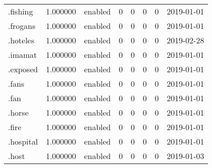 \begin{tabular}{lrlrrrrl}
.fishing                  &          1.000000 &         enabled &                           0 &                           0 &                           0 &                   0 &           2019-01-01 \\
.frogans                  &          1.000000 &         enabled &                           0 &                           0 &                           0 &                   0 &           2019-01-01 \\
.hoteles                  &          1.000000 &         enabled &                           0 &                           0 &                           0 &                   0 &           2019-02-28 \\
.imamat                   &          1.000000 &         enabled &                           0 &                           0 &                           0 &                   0 &           2019-01-01 \\
.exposed                  &          1.000000 &         enabled &                           0 &                           0 &                           0 &                   0 &           2019-01-01 \\
.fans                     &          1.000000 &         enabled &                           0 &                           0 &                           0 &                   0 &           2019-01-01 \\
.fan                      &          1.000000 &         enabled &                           0 &                           0 &                           0 &                   0 &           2019-01-01 \\
.horse                    &          1.000000 &         enabled &                           0 &                           0 &                           0 &                   0 &           2019-01-01 \\
.fire                     &          1.000000 &         enabled &                           0 &                           0 &                           0 &                   0 &           2019-01-01 \\
.hospital                 &          1.000000 &         enabled &                           0 &                           0 &                           0 &                   0 &           2019-01-01 \\
.host                     &          1.000000 &         enabled &                           0 &                           0 &                           0 &                   0 &           2019-01-03 \\

\end{tabular}

